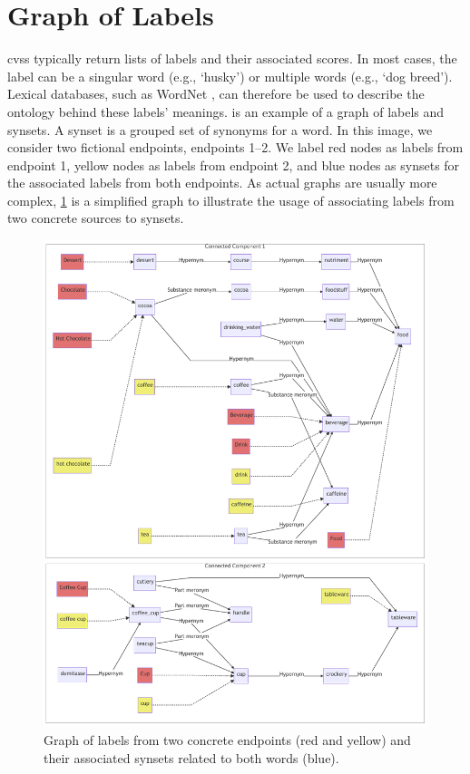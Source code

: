 \section{Graph of Labels}\label{icwe2019:sec:graph-of-labels}

\Glspl{cvs} typically return lists of labels and their associated scores. In most cases, the label can be a singular word (e.g., `husky') or multiple words (e.g., `dog breed'). Lexical databases, such as WordNet \citep{WordNetMiller1995}, can therefore be used to describe the ontology behind these labels' meanings.
 is an example of a graph of labels and synsets.
A synset is a grouped set of synonyms for a word.
In this image, we consider two fictional endpoints, endpoints 1--2. We label red nodes as labels from endpoint 1, yellow nodes as labels from endpoint 2, and blue nodes as synsets for the associated labels from both endpoints.
As actual graphs are usually more complex, \cref{icwe2019:fig:labels-graph} is a simplified graph to illustrate the usage of associating labels from two concrete sources to synsets.

\begin{figure}
\centering\includegraphics[width=\linewidth]{mermaid_coffee}
\caption[Graph of associated synsets against two different endpoints]{Graph of labels from two concrete endpoints (red and yellow) and their associated synsets related to both words (blue).}\label{icwe2019:fig:labels-graph}
\end{figure}

